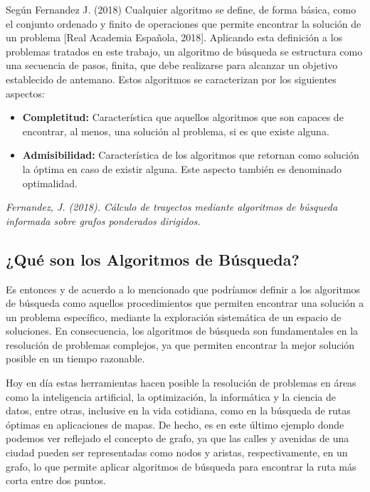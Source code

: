 \documentclass[11pt, a4paper]{article}
\begin{document}
  Según Fernandez J. (2018) Cualquier algoritmo se define, de forma básica, como el conjunto ordenado y finito de operaciones que permite encontrar la solución de un problema [Real Academia Española, 2018]. Aplicando esta definición a los problemas tratados en este trabajo, un algoritmo de búsqueda se estructura como una secuencia de pasos, finita, que debe realizarse para alcanzar un objetivo establecido de antemano. Estos algoritmos se caracterizan por los siguientes aspectos:

  \begin{itemize}
    \item \textbf{Completitud:} Característica que aquellos algoritmos que son capaces de encontrar, al menos, una solución al problema, si es que existe alguna.
    \item \textbf{Admisibilidad:} Característica de los algoritmos que retornan como solución la óptima en caso de existir alguna. Este aspecto también es denominado optimalidad.
  \end{itemize}

  \begin{flushright}
    \textit{Fernandez, J. (2018). Cálculo de trayectos mediante algoritmos de búsqueda informada sobre grafos ponderados dirigidos.}
  \end{flushright}

  \subsection{¿Qué son los Algoritmos de Búsqueda?}

  Es entonces y de acuerdo a lo mencionado que podríamos definir a los algoritmos de búsqueda como aquellos procedimientos que permiten encontrar una solución a un problema específico, mediante la exploración sistemática de un espacio de soluciones. En consecuencia, los algoritmos de búsqueda son fundamentales en la resolución de problemas complejos, ya que permiten encontrar la mejor solución posible en un tiempo razonable.

  Hoy en día estas herramientas hacen posible la resolución de problemas en áreas como la inteligencia artificial, la optimización, la informática y la ciencia de datos, entre otras, inclusive en la vida cotidiana, como en la búsqueda de rutas óptimas en aplicaciones de mapas. De hecho, es en este último ejemplo donde podemos ver reflejado el concepto de grafo, ya que las calles y avenidas de una ciudad pueden ser representadas como nodos y aristas, respectivamente, en un grafo, lo que permite aplicar algoritmos de búsqueda para encontrar la ruta más corta entre dos puntos.
\end{document}
